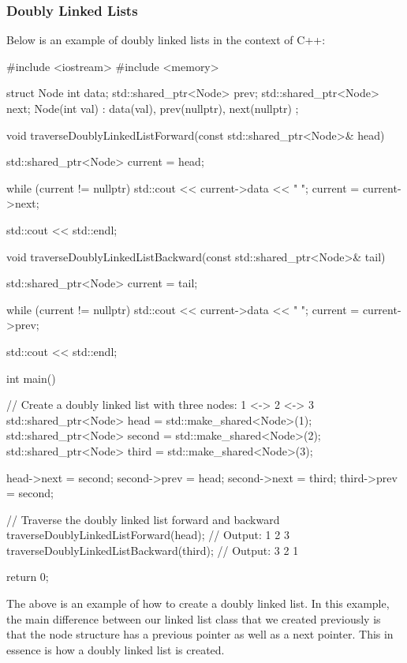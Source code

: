 \begin{highlight}

\subsubsection*{Doubly Linked Lists}

Below is an example of doubly linked lists in the context of C++:

\begin{code}
#include <iostream>
#include <memory>

struct Node {
    int data;
    std::shared_ptr<Node> prev;
    std::shared_ptr<Node> next;
    Node(int val) : data(val), prev(nullptr), next(nullptr) {}
};

void traverseDoublyLinkedListForward(const std::shared_ptr<Node>& head) {
    std::shared_ptr<Node> current = head;

    while (current != nullptr) {
        std::cout << current->data << " ";
        current = current->next;
    }

    std::cout << std::endl;
}

void traverseDoublyLinkedListBackward(const std::shared_ptr<Node>& tail) {
    std::shared_ptr<Node> current = tail;

    while (current != nullptr) {
        std::cout << current->data << " ";
        current = current->prev;
    }

    std::cout << std::endl;
}

int main() {
    // Create a doubly linked list with three nodes: 1 <-> 2 <-> 3
    std::shared_ptr<Node> head = std::make_shared<Node>(1);
    std::shared_ptr<Node> second = std::make_shared<Node>(2);
    std::shared_ptr<Node> third = std::make_shared<Node>(3);

    head->next = second;
    second->prev = head;
    second->next = third;
    third->prev = second;

    // Traverse the doubly linked list forward and backward
    traverseDoublyLinkedListForward(head);  // Output: 1 2 3
    traverseDoublyLinkedListBackward(third);  // Output: 3 2 1

    return 0;
}    
\end{code}

The above is an example of how to create a doubly linked list. In this example, the main difference between our linked list class that we created previously is that the node structure has a previous
pointer as well as a next pointer. This in essence is how a doubly linked list is created.

\end{highlight}

